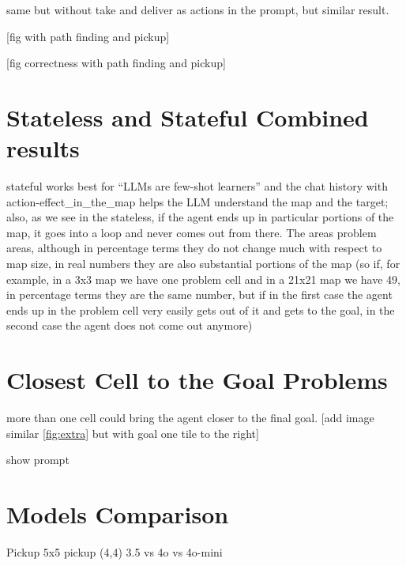 same but without take and deliver as actions in the prompt, but similar result.

[fig with path finding and pickup]

[fig correctness with path finding and pickup]

\section{Stateless and Stateful Combined results}
\label{sec:stateless_and_stateful_combined_results}

stateful works best for “LLMs are few-shot learners” and the chat history with
action-effect\_in\_the\_map helps the LLM understand the map and the target; also,
as we see in the stateless, if the agent ends up in particular portions of the map,
it goes into a loop and never comes out from there. The areas problem areas,
although in percentage terms they do not change much with respect to map size, in
real numbers they are also substantial portions of the map (so if, for example,
in a 3x3 map we have one problem cell and in a 21x21 map we have 49, in percentage
terms they are the same number, but if in the first case the agent ends up in
the problem cell very easily gets out of it and gets to the goal, in the second case
the agent does not come out anymore)

\section{Closest Cell to the Goal Problems}
\label{sec:closest_cell_to_the_goal_problems} more than one cell could bring the
agent closer to the final goal. [add image similar \ref{fig:extra} but with goal
one tile to the right]

show prompt

\section{Models Comparison}
\label{sec:models_comparison}

Pickup 5x5 pickup (4,4) 3.5 vs 4o vs 4o-mini